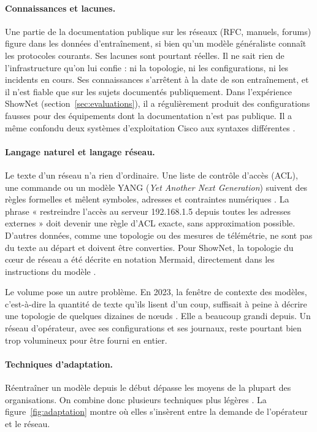 \paragraph{Connaissances et lacunes.}
Une partie de la documentation publique sur les réseaux (RFC, manuels, forums) figure dans les données d'entraînement, si bien qu'un modèle généraliste connaît les protocoles courants. Ses lacunes sont pourtant réelles. Il ne sait rien de l'infrastructure qu'on lui confie : ni la topologie, ni les configurations, ni les incidents en cours. Ses connaissances s'arrêtent à la date de son entraînement, et il n'est fiable que sur les sujets documentés publiquement. Dans l'expérience ShowNet (section~\ref{sec:evaluations}), il a régulièrement produit des configurations fausses pour des équipements dont la documentation n'est pas publique. Il a même confondu deux systèmes d'exploitation Cisco aux syntaxes différentes \cite{nakamura2026}.

\paragraph{Langage naturel et langage réseau.}
Le texte d'un réseau n'a rien d'ordinaire. Une liste de contrôle d'accès (ACL), une commande ou un modèle YANG (\emph{Yet Another Next Generation}) suivent des règles formelles et mêlent symboles, adresses et contraintes numériques \cite{huang2024}. La phrase « restreindre l'accès au serveur 192.168.1.5 depuis toutes les adresses externes » doit devenir une règle d'ACL exacte, sans approximation possible. D'autres données, comme une topologie ou des mesures de télémétrie, ne sont pas du texte au départ et doivent être converties. Pour ShowNet, la topologie du cœur de réseau a été décrite en notation Mermaid, directement dans les instructions du modèle \cite{nakamura2026}.

Le volume pose un autre problème. En 2023, la fenêtre de contexte des modèles, c'est-à-dire la quantité de texte qu'ils lisent d'un coup, suffisait à peine à décrire une topologie de quelques dizaines de nœuds \cite{mani2023}. Elle a beaucoup grandi depuis. Un réseau d'opérateur, avec ses configurations et ses journaux, reste pourtant bien trop volumineux pour être fourni en entier.

\paragraph{Techniques d'adaptation.}
Réentraîner un modèle depuis le début dépasse les moyens de la plupart des organisations. On combine donc plusieurs techniques plus légères \cite{liu2025,hong2025}. La figure~\ref{fig:adaptation} montre où elles s'insèrent entre la demande de l'opérateur et le réseau.

